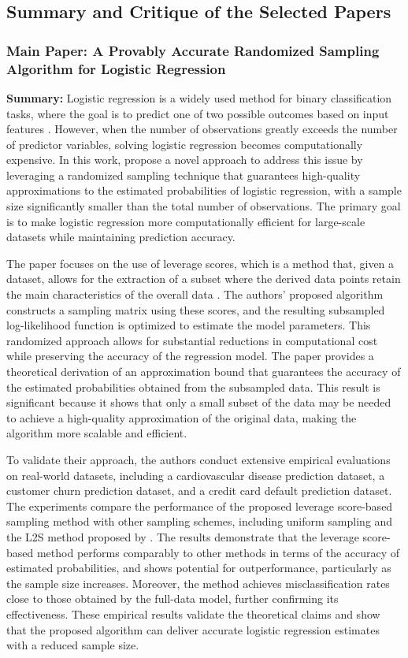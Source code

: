\documentclass{article}
\theoremstyle{plain}
\theoremstyle{definition}
\theoremstyle{remark}
\begin{document}
\subsection{Summary and Critique of the Selected Papers}

\subsubsection{Main Paper: A Provably Accurate Randomized Sampling Algorithm for Logistic Regression \cite{chow24}}

\textbf{Summary:} Logistic regression is a widely used method for binary classification tasks, where the goal is to predict one of two possible outcomes based on input features \cite{pml}. However, when the number of observations greatly exceeds the number of predictor variables, solving logistic regression becomes computationally expensive. In this work, \citeauthor{chow24} propose a novel approach to address this issue by leveraging a randomized sampling technique that guarantees high-quality approximations to the estimated probabilities of logistic regression, with a sample size significantly smaller than the total number of observations. The primary goal is to make logistic regression more computationally efficient for large-scale datasets while maintaining prediction accuracy.

The paper focuses on the use of leverage scores, which is a method that, given a dataset, allows for the extraction of a subset where the derived data points retain the main characteristics of the overall data \cite{ordo22}. The authors' proposed algorithm constructs a sampling matrix using these scores, and the resulting subsampled log-likelihood function is optimized to estimate the model parameters. This randomized approach allows for substantial reductions in computational cost while preserving the accuracy of the regression model.
The paper provides a theoretical derivation of an approximation bound that guarantees the accuracy of the estimated probabilities obtained from the subsampled data. This result is significant because it shows that only a small subset of the data may be needed to achieve a high-quality approximation of the original data, making the algorithm more scalable and efficient.

To validate their approach, the authors conduct extensive empirical evaluations on real-world datasets, including a cardiovascular disease prediction dataset, a customer churn prediction dataset, and a credit card default prediction dataset. The experiments compare the performance of the proposed leverage score-based sampling method with other sampling schemes, including uniform sampling and the L2S method proposed by \citeauthor{mun18}. The results demonstrate that the leverage score-based method performs comparably to other methods in terms of the accuracy of estimated probabilities, and shows potential for outperformance, particularly as the sample size increases. Moreover, the method achieves misclassification rates close to those obtained by the full-data model, further confirming its effectiveness. These empirical results validate the theoretical claims and show that the proposed algorithm can deliver accurate logistic regression estimates with a reduced sample size.
\end{document}
